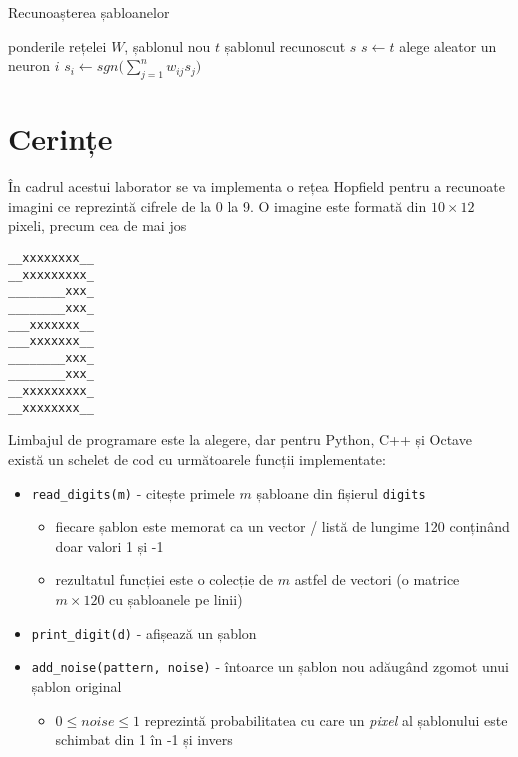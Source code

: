 \documentclass[12pt]{article}
\begin{document}
\begin{algorithm}
  \caption{Recunoașterea șabloanelor}
  \label{alg:recognition}
  \begin{algorithmic}[1]
    \REQUIRE ponderile rețelei $W$, șablonul nou $t$%
    \ENSURE șablonul recunoscut $s$%
    \STATE $s \longleftarrow t$%
    \REPEAT%
    \STATE alege aleator un neuron $i$%
    \STATE $s_i \longleftarrow sgn\Big(\displaystyle\sum_{j=1}^{n} w_{ij}s_j\Big)$%
  \end{algorithmic}
\end{algorithm}

\section{Cerințe}
\label{sec:tasks}

În cadrul acestui laborator se va implementa o rețea Hopfield pentru a
recunoate imagini ce reprezintă cifrele de la 0 la 9. O imagine este
formată din $10\times12$ pixeli, precum cea de mai jos
\begin{verbatim}
__xxxxxxxx__
__xxxxxxxxx_
________xxx_
________xxx_
___xxxxxxx__
___xxxxxxx__
________xxx_
________xxx_
__xxxxxxxxx_
__xxxxxxxx__
\end{verbatim}

Limbajul de programare este la alegere, dar pentru Python, C++ și
Octave există un schelet de cod cu următoarele funcții implementate:

\begin{itemize}
\item \texttt{read\_digits(m)} - citește primele $m$ șabloane din
  fișierul \texttt{digits}
  \begin{itemize}
  \item fiecare șablon este memorat ca un vector / listă de lungime
    120 conținând doar valori 1 și -1
  \item rezultatul funcției este o colecție de $m$ astfel de vectori
    (o matrice $m \times 120$ cu șabloanele pe linii)
  \end{itemize}
\item \texttt{print\_digit(d)} - afișează un șablon
\item \texttt{add\_noise(pattern, noise)} - întoarce un șablon nou
  adăugând zgomot unui șablon original
  \begin{itemize}
  \item $0 \le noise \le 1$ reprezintă probabilitatea cu care un
    \emph{pixel} al șablonului este schimbat din 1 în -1 și invers
  \end{itemize}
\end{itemize}
\end{document}
